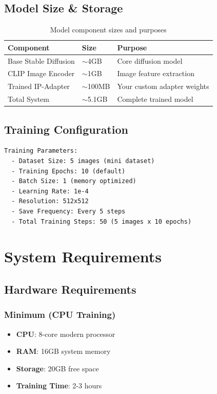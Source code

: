 \documentclass[11pt,a4paper]{article}
\begin{document}
\subsection{Model Size \& Storage}

\begin{table}[h]
\centering
\begin{tabular}{@{}lll@{}}
\toprule
\textbf{Component} & \textbf{Size} & \textbf{Purpose} \\
\midrule
Base Stable Diffusion & $\sim$4GB & Core diffusion model \\
CLIP Image Encoder & $\sim$1GB & Image feature extraction \\
Trained IP-Adapter & $\sim$100MB & Your custom adapter weights \\
Total System & $\sim$5.1GB & Complete trained model \\
\bottomrule
\end{tabular}
\caption{Model component sizes and purposes}
\end{table}

\subsection{Training Configuration}

\begin{lstlisting}[language=html,caption=Training Parameters]
Training Parameters:
  - Dataset Size: 5 images (mini dataset)
  - Training Epochs: 10 (default)
  - Batch Size: 1 (memory optimized)
  - Learning Rate: 1e-4
  - Resolution: 512x512
  - Save Frequency: Every 5 steps
  - Total Training Steps: 50 (5 images x 10 epochs)
\end{lstlisting}

\section{System Requirements}

\subsection{Hardware Requirements}

\subsubsection{Minimum (CPU Training)}
\begin{itemize}
    \item \textbf{CPU}: 8-core modern processor
    \item \textbf{RAM}: 16GB system memory
    \item \textbf{Storage}: 20GB free space
    \item \textbf{Training Time}: 2-3 hours
\end{itemize}
\end{document}
